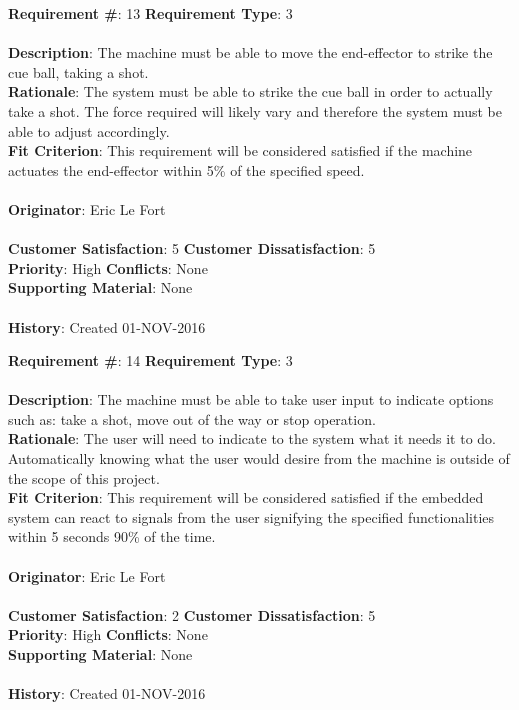 \documentclass[titlepage]{article}
\begin{document}
\begin{framed}
	\noindent\textbf{Requirement \#}: 13 \hfill \textbf{Requirement Type}: 3 \hfill\\\\
	\noindent\textbf{Description}: The machine must be able to move the end-effector to strike the cue ball, taking a shot.\\
	\textbf{Rationale}: The system must be able to strike the cue ball in order to actually take a shot. The force required will likely vary and therefore the system must be able to adjust accordingly.\\
	\textbf{Fit Criterion}: This requirement will be considered satisfied if the machine actuates the end-effector within 5\% of the specified speed.\\\\
	\textbf{Originator}: Eric Le Fort\\\\
	\noindent\textbf{Customer Satisfaction}: 5 \hfill 	\textbf{Customer Dissatisfaction}: 5 \hfill\\
	\textbf{Priority}: High \hfill \textbf{Conflicts}: None \hfill\\
	\textbf{Supporting Material}: None\\\\
	\noindent\textbf{History}: Created 01-NOV-2016
\end{framed}

\begin{framed}
	\noindent\textbf{Requirement \#}: 14 \hfill \textbf{Requirement Type}: 3 \hfill\\\\
	\noindent\textbf{Description}: The machine must be able to take user input to indicate options such as: take a shot, move out of the way or stop operation.\\
	\textbf{Rationale}: The user will need to indicate to the system what it needs it to do. Automatically knowing what the user would desire from the machine is outside of the scope of this project.\\
	\textbf{Fit Criterion}: This requirement will be considered satisfied if the embedded system can react to signals from the user signifying the specified functionalities within 5 seconds 90\% of the time.\\\\
	\textbf{Originator}: Eric Le Fort\\\\
	\noindent\textbf{Customer Satisfaction}: 2 \hfill 	\textbf{Customer Dissatisfaction}: 5 \hfill\\
	\textbf{Priority}: High \hfill \textbf{Conflicts}: None \hfill\\
	\textbf{Supporting Material}: None\\\\
	\noindent\textbf{History}: Created 01-NOV-2016
\end{framed}
\end{document}
